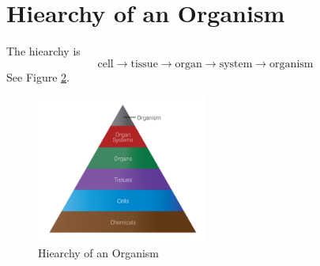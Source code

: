 \documentclass[12pt]{report}
\begin{document}
\begin{figure}[!htb]
    \centering
    \qquad
    \label{fig:example}
\end{figure}

\section{Hiearchy of an Organism}
\begin{definition}
    The hiearchy is 
    \[
        \text{cell}\to \text{tissue}\to \text{organ}\to \text{system}\to \text{organism}
    \]
    See Figure \ref{fig:hierachy}.
\end{definition}

\begin{figure}[H]
\centering
    \includegraphics[width=0.5\textwidth]{../figures/hiearchy.png}
    \caption{Hiearchy of an Organism}
    \label{fig:hierachy}
\end{figure}
\end{document}
